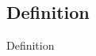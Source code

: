 \subsection{Definition}

\frame{
    \tableofcontents[ 
        currentsubsection, 
    ]
}

\begin{frame}{Definition}






\end{frame}